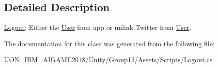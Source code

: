 \subsection{Detailed Description}
\mbox{\hyperlink{class_logout}{Logout}}\+: Either the \mbox{\hyperlink{class_user}{User}} from app or unlink Twitter from \mbox{\hyperlink{class_user}{User}}. 

The documentation for this class was generated from the following file\+:\begin{DoxyCompactItemize}
\item 
U\+O\+N\+\_\+\+I\+B\+M\+\_\+\+A\+I\+G\+A\+M\+E2018/\+Unity/\+Group15/\+Assets/\+Scripts/Logout.\+cs\end{DoxyCompactItemize}
